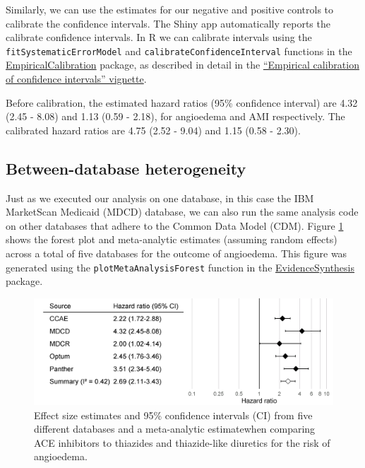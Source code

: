 \documentclass[11pt]{book}
\theoremstyle{definition}
\theoremstyle{definition}
\theoremstyle{definition}
\theoremstyle{remark}
\begin{document}
Similarly, we can use the estimates for our negative and positive controls to calibrate the confidence intervals. The Shiny app automatically reports the calibrate confidence intervals. In R we can calibrate intervals using the \texttt{fitSystematicErrorModel} and \texttt{calibrateConfidenceInterval} functions in the \href{https://ohdsi.github.io/EmpiricalCalibration/}{EmpiricalCalibration} package, as described in detail in the \href{https://ohdsi.github.io/EmpiricalCalibration/articles/EmpiricalCiCalibrationVignette.html}{``Empirical calibration of confidence intervals'' vignette}.

Before calibration, the estimated hazard ratios (95\% confidence interval) are 4.32 (2.45 - 8.08) and 1.13 (0.59 - 2.18), for angioedema and AMI respectively. The calibrated hazard ratios are 4.75 (2.52 - 9.04) and 1.15 (0.58 - 2.30).

\hypertarget{between-database-heterogeneity}{%
\subsection{Between-database heterogeneity}\label{between-database-heterogeneity}}

Just as we executed our analysis on one database, in this case the IBM MarketScan Medicaid (MDCD) database, we can also run the same analysis code on other databases that adhere to the Common Data Model (CDM). Figure \ref{fig:forest} shows the forest plot and meta-analytic estimates (assuming random effects) \citep{dersimonian_1986} across a total of five databases for the outcome of angioedema. This figure was generated using the \texttt{plotMetaAnalysisForest} function in the \href{https://ohdsi.github.io/EvidenceSynthesis/}{EvidenceSynthesis} package.

\begin{figure}

{\centering \includegraphics[width=0.9\linewidth]{images/MethodValidity/forest} 

}

\caption{Effect size estimates and 95\% confidence intervals (CI) from five different databases and a meta-analytic estimatewhen comparing ACE inhibitors to thiazides and thiazide-like diuretics for the risk of angioedema.}\label{fig:forest}
\end{figure}
\end{document}
